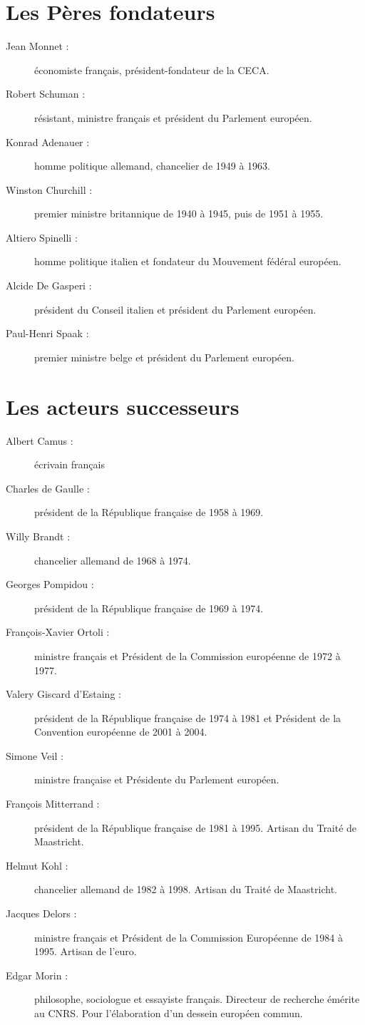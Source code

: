 \documentclass{report}%
\begin{document}
\section{Les Pères fondateurs}
	\begin{description}
		\item [Jean Monnet :] économiste français, président-fondateur de la CECA.
		\item [Robert Schuman :] résistant, ministre français et président du Parlement européen.
		\item [Konrad Adenauer :] homme politique allemand, chancelier de 1949 à 1963.
		\item [Winston Churchill :] premier ministre britannique de 1940 à 1945, puis de 1951 à 1955.
		\item [Altiero Spinelli :] homme politique italien et fondateur du Mouvement fédéral européen.
		\item [Alcide De Gasperi :] président du Conseil italien et président du Parlement européen.
		\item [Paul-Henri Spaak :] premier ministre belge et président du Parlement européen.
	\end{description}
\section{Les acteurs successeurs}
	\begin{description}
		\item [Albert Camus :] écrivain français
		\item [Charles de Gaulle :] président de la République française de 1958 à 1969.
		\item [Willy Brandt :] chancelier allemand de 1968 à 1974.
		\item [Georges Pompidou :] président de la République française de 1969 à 1974.
		\item [François-Xavier Ortoli :] ministre français et Président de la Commission européenne de 1972 à 1977.
		\item [Valery Giscard d'Estaing :] président de la République française de 1974 à 1981 et Président de la Convention européenne de 2001 à 2004.
		\item [Simone Veil :] ministre française et Présidente du Parlement européen.
		\item [François Mitterrand :] président de la République française de 1981 à 1995. Artisan du Traité de Maastricht.
		\item [Helmut Kohl :] chancelier allemand de 1982 à 1998. Artisan du Traité de Maastricht.
		\item [Jacques Delors :] ministre français et Président de la Commission Européenne de 1984 à 1995. Artisan de l'euro.
		\item [Edgar Morin :] philosophe, sociologue et essayiste français. Directeur de recherche émérite au CNRS. Pour l'élaboration d'un dessein européen commun.
	\end{description}
\end{document}
